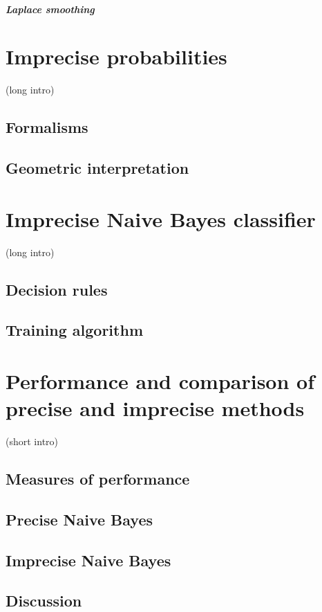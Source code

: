 \documentclass{report}
\theoremstyle{definition}
\begin{document}
\paragraph{Laplace smoothing}






\chapter{Imprecise probabilities}
	(long intro)
	\section{Formalisms}
	\section{Geometric interpretation}


\chapter{Imprecise Naive Bayes classifier}
	(long intro)
	\section{Decision rules}
	\section{Training algorithm}

\chapter{Performance and comparison of precise and imprecise methods}
	(short intro)
	\section{Measures of performance}
	\section{Precise Naive Bayes}
	\section{Imprecise Naive Bayes}
	\section{Discussion}  %
\end{document}
